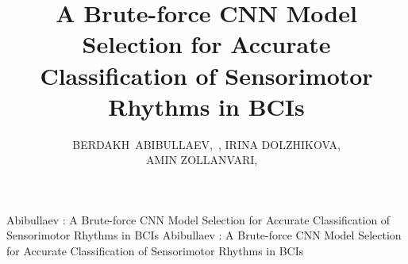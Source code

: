 \documentclass{ieeeaccess}
\begin{document}
	
\history{}
\doi{}

\title{A Brute-force CNN Model Selection for Accurate Classification of Sensorimotor Rhythms in BCIs}

\author{\uppercase{Berdakh~Abibullaev},~, 
	\uppercase{Irina Dolzhikova},\\ 
	\uppercase{Amin Zollanvari}, ~} 

\address[1]{Department of Robotics and Mechatronics, Nazarbayev University, 010000, Kazakhstan (e-mail: berdakh.abibullaev@nu.edu.kz)} 
\address[2]{Department of Electrical Engineering, Nazarbayev University, 010000, Kazakhstan (e-mail: ifedorova@nu.edu.kz)}        
\address[3]{Department of Electrical Engineering, Nazarbayev University, 010000, Kazakhstan (e-mail: amin.zollanvari@nu.edu.kz)}        
\markboth
{Abibullaev \headeretal: A Brute-force CNN Model Selection for Accurate Classification of Sensorimotor Rhythms in BCIs}
{Abibullaev \headeretal: A Brute-force CNN Model Selection for Accurate Classification of Sensorimotor Rhythms in BCIs}

\end{document}
